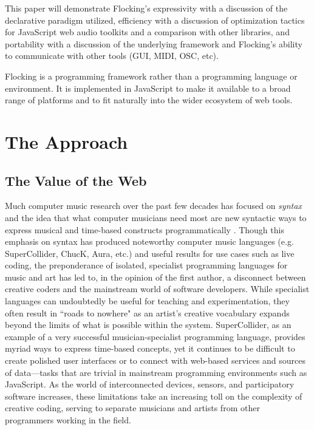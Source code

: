 \documentclass{article}
\begin{document}
This paper will demonstrate Flocking's expressivity with a discussion of the declarative paradigm utilized, efficiency with a discussion of optimization tactics for JavaScript web audio toolkits and a comparison with other libraries, and portability with a discussion of the underlying framework and Flocking's ability to communicate with other tools (GUI, MIDI, OSC, etc).

Flocking is a programming framework rather than a programming language or environment. It is implemented in JavaScript to make it available to a broad range of platforms and to fit naturally into the wider ecosystem of web tools.

\section{The Approach}

\subsection{The Value of the Web}

Much computer music research over the past few decades has focused on {\it syntax} and the idea that what computer musicians need most are new syntactic ways to express musical and time-based constructs programmatically \cite{dannenberg2002language}. Though this emphasis on syntax has produced noteworthy computer music languages (e.g. SuperCollider, ChucK, Aura, etc.) and useful results for use cases such as live coding, the preponderance of isolated, specialist programming languages for music and art has led to, in the opinion of the first author, a disconnect between creative coders and the mainstream world of software developers. While specialist languages can undoubtedly be useful for teaching and experimentation, they often result in ``roads to nowhere" as an artist's creative vocabulary expands beyond the limits of what is possible within the system. SuperCollider, as an example of a very successful musician-specialist programming language, provides myriad ways to express time-based concepts, yet it continues to be difficult to create polished user interfaces or to connect with web-based services and sources of data---tasks that are trivial in mainstream programming environments such as JavaScript. As the world of interconnected devices, sensors, and participatory software increases, these limitations take an increasing toll on the complexity of creative coding, serving to separate musicians and artists from other programmers working in the field.
\end{document}
